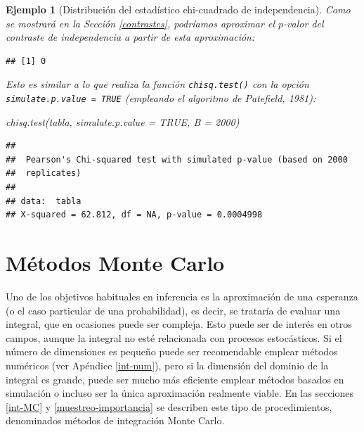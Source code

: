 \documentclass[
]{book}
\newenvironment{Shaded}{\begin{snugshade}}{\end{snugshade}}
\newcommand{\AttributeTok}[1]{\textcolor[rgb]{0.77,0.63,0.00}{#1}}
\newcommand{\ConstantTok}[1]{\textcolor[rgb]{0.00,0.00,0.00}{#1}}
\newcommand{\DecValTok}[1]{\textcolor[rgb]{0.00,0.00,0.81}{#1}}
\newcommand{\FunctionTok}[1]{\textcolor[rgb]{0.00,0.00,0.00}{#1}}
\newcommand{\NormalTok}[1]{#1}
\newcommand{\OtherTok}[1]{\textcolor[rgb]{0.56,0.35,0.01}{#1}}
\newcommand{\SpecialCharTok}[1]{\textcolor[rgb]{0.00,0.00,0.00}{#1}}
\theoremstyle{break}
\newtheorem{example}{Ejemplo}[chapter]
\theoremstyle{nonumberplain}
\begin{document}
\begin{example}[Distribución del estadístico chi-cuadrado de independencia]
Como se mostrará en la Sección \ref{contrastes}, podríamos aproximar el \(p\)-valor del contraste de independencia a partir de esta aproximación:

\begin{Shaded}
\end{Shaded}

\begin{verbatim}
## [1] 0
\end{verbatim}

Esto es similar a lo que realiza la función \texttt{chisq.test()} con la opción \texttt{simulate.p.value\ =\ TRUE} (empleando el algoritmo de Patefield, 1981):

\begin{Shaded}
\begin{Highlighting}[]
\FunctionTok{chisq.test}\NormalTok{(tabla, }\AttributeTok{simulate.p.value =} \ConstantTok{TRUE}\NormalTok{, }\AttributeTok{B =} \DecValTok{2000}\NormalTok{)}
\end{Highlighting}
\end{Shaded}

\begin{verbatim}
## 
##  Pearson's Chi-squared test with simulated p-value (based on 2000
##  replicates)
## 
## data:  tabla
## X-squared = 62.812, df = NA, p-value = 0.0004998
\end{verbatim}

\end{example}

\hypertarget{monte-carlo}{%
\chapter{Métodos Monte Carlo}\label{monte-carlo}}

Uno de los objetivos habituales en inferencia es la aproximación de una esperanza (o el caso particular de una probabilidad), es decir, se trataría de evaluar una integral, que en ocasiones puede ser compleja.
Esto puede ser de interés en otros campos, aunque la integral no esté relacionada con procesos estocásticos.
Si el número de dimensiones es pequeño puede ser recomendable emplear métodos numéricos (ver Apéndice \ref{int-num}), pero si la dimensión del dominio de la integral es grande, puede ser mucho más eficiente emplear métodos basados en simulación o incluso ser la única aproximación realmente viable.
En las secciones \ref{int-MC} y \ref{muestreo-importancia} se describen este tipo de procedimientos, denominados métodos de integración Monte Carlo.
\end{document}
